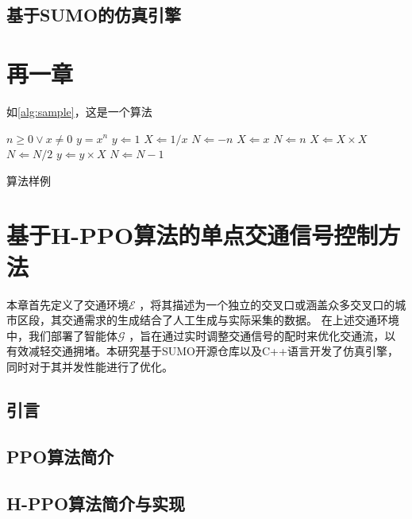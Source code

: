 \section{基于SUMO的仿真引擎}




\chapter{再一章}

\par 如\autoref{alg:sample}，这是一个算法

\begin{algorithm}[H]
    \begin{algorithmic} %
        \REQUIRE $n \geq 0 \vee x \neq 0$
        \ENSURE $y = x^n$
        \STATE $y \Leftarrow 1$
            \STATE $X \Leftarrow 1 / x$
            \STATE $N \Leftarrow -n$
        \ELSE
            \STATE $X \Leftarrow x$
            \STATE $N \Leftarrow n$
        \ENDIF
                \STATE $X \Leftarrow X \times X$
                \STATE $N \Leftarrow N / 2$
            \ELSE[$N$ is odd]
                \STATE $y \Leftarrow y \times X$
                \STATE $N \Leftarrow N - 1$
            \ENDIF
        \ENDWHILE
    \end{algorithmic}
    \caption{\label{alg:sample}算法样例}
\end{algorithm}


\chapter{基于H-PPO算法的单点交通信号控制方法}
本章首先定义了交通环境$\mathcal{E}$ ，将其描述为一个独立的交叉口或涵盖众多交叉口的城市区段，其交通需求的生成结合了人工生成与实际采集的数据。
在上述交通环境中，我们部署了智能体$\mathcal{G}$ ，旨在通过实时调整交通信号的配时来优化交通流，以有效减轻交通拥堵。本研究基于SUMO开源仓库以及C++语言开发了仿真引擎，同时对于其并发性能进行了优化。
\section{引言}
\section{PPO算法简介}
\section{H-PPO算法简介与实现}
